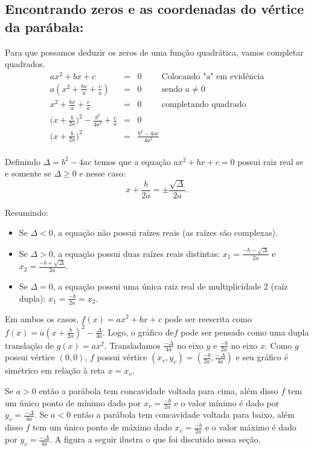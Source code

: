 \subsection{Encontrando zeros e as coordenadas do vértice da parábala:}

Para que possamos deduzir os zeros de uma função quadrática, vamos completar quadrados.
\begin{eqnarray*}
ax^2+bx+c&=&0 \hspace{1cm} \textrm{Colocando  "a" em evidência} \\
a \left(x^2+\frac{bx}{a}+\frac{c}{a}  \right)&=&0  \hspace{1cm}\textrm{sendo $a \neq 0$} \\
x^2+\frac{bx}{a}+\frac{c}{a}&=&0 \hspace{1cm}\textrm{completando quadrado} \\
\Big(x+\frac{b}{2a}\Big)^2-\frac{b^2}{4a^2}+\frac{c}{a}&=&0 \\
\Big(x+\frac{b}{2a}\Big)^2&=&\frac{b^2-4ac}{4a^2} \\
\end{eqnarray*}

Definindo $\Delta = b^2-4ac$ temos que a equação $ax^2+bx+c=0$ possui raiz real se e somente se $\Delta \geq 0$ e nesse caso:
\[x+\frac{b}{2a}=\pm\frac{\sqrt{\Delta}}{2a}.\]


Resumindo:
\begin{itemize}
	\item Se $\Delta < 0$, a equação não possui raízes reais (as raízes são complexas).
	\item Se $\Delta > 0$, a equação possui duas raízes reais distintas: $x_1 = \frac{-b-\sqrt{\Delta}}{2a}$ e $x_2=\frac{-b+\sqrt{\Delta}}{2a}.$
	\item Se $\Delta = 0$, a equação possui uma única raiz real de multiplicidade 2 (raíz dupla): $x_1=\frac{-b}{2a}=x_2.$
\end{itemize}

Em ambos os casos, $f(x)=ax^2+bx+c$ pode ser reescrita como $f(x)= a\left(x+\frac{b}{2a}\right)^2-\frac{\Delta}{4a}.$ Logo, o gráfico de$f$ pode ser pensado como uma dupla translação de  $g(x)=ax^2$. Transladamos $\frac{-\Delta}{4a}$ no eixo $y$ e $\frac{-b}{2a}$ no eixo $x$. Como $g$ possui vértice $(0,0)$, $f$ possui vértice $(x_v,y_v)=\left(\frac{-b}{2a},\frac{-\Delta}{4a}\right)$ e seu gráfico é simétrico em relação à reta $x=x_v$.

Se $a >0$ então a parábola tem concavidade voltada para cima, além disso $f$ tem um único ponto de mínimo dado por $x_v=\frac{-b}{2a}$ e o valor mínimo é dado por $y_v= \frac{-\Delta}{4a}$. Se $a <0$ então a parábola tem concavidade voltada para baixo, além disso $f$ tem um único ponto de máximo dado $x_v=\frac{-b}{2a}$ e o valor máximo é dado por $y_v= \frac{-\Delta}{4a}$. A figura a seguir ilustra o que foi discutido nessa seção.


